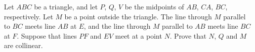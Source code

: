 Let $ABC$ be a triangle, and let $P$, $Q$, $V$ be the midpoints of $AB$, $CA$, $BC$, respectively. Let $M$ be a point outside the triangle. The line through $M$ parallel to $BC$ meets line $AB$ at $E$, and the line through $M$ parallel to $AB$ meets line $BC$ at $F$. Suppose that lines $PF$ and $EV$ meet at a point $N$. Prove that $N$, $Q$ and $M$ are collinear.
